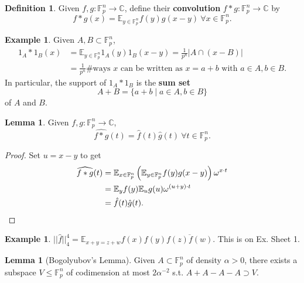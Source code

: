 \documentclass{article}
\theoremstyle{definition}
\newtheorem{lemma}[theorem]{Lemma}
\newtheorem{example}[theorem]{Example}
\newtheorem{defn}[theorem]{Definition}
\begin{document}

\begin{defn}\label{defn1.9}
    Given $f, g : \mathbb{F}_p^n \to \mathbb{C}$, define their \textbf{convolution} $f * g :\mathbb{F}_p^n \to \mathbb{C}$ by $$f*g(x) = \mathbb{E}_{y \in \mathbb{F}_p^n}f(y)g(x-y) ~\forall x \in \mathbb{F}_p^n.$$
\end{defn}
\begin{example}\label{ex1.10}
    Given $A, B \subset \mathbb{F}_p^n$, 
    \begin{align*}
        1_A * 1_B(x) &= \mathbb{E}_{y \in \mathbb{F}_p^n}1_A(y)1_B(x-y) = \frac{1}{p^n}|A \cap (x-B)| \\
        &= \frac{1}{p^n} \# \text{ways }x \text{ can be written as }x=a+b \text{ with }a \in A, b \in B.
    \end{align*}
    In particular, the support of $1_A * 1_B$ is the \textbf{sum set} \[
    A+B = \{a+b \mid a \in A, b \in B\}
    \]
    of $A$ and $B$.
\end{example}
\begin{lemma}\label{lemma1.11}
    Given $f, g : \mathbb{F}_p^n \to \mathbb{C}$, $$\widehat{f * g}(t) = \hat{f}(t)\hat{g}(t) ~\forall t \in \mathbb{F}_p^n.$$
\end{lemma}
\begin{proof}
    Set $u = x-y$ to get
    \begin{align*}
        \widehat{f * g}(t) &= \mathbb{E}_{x \in \mathbb{F}_p^n}\left(\mathbb{E}_{y \in \mathbb{F}_p^n}f(y)g(x-y)\right)\omega^{x \cdot t} \\
        &= \mathbb{E}_y f(y) \mathbb{E}_u g(u) \omega^{(u+y)\cdot t} \\
        &= \hat{f}(t)\hat{g}(t).\qedhere
    \end{align*}
\end{proof}
\begin{example}
    $||\hat{f}||_4^4 = \mathbb{E}_{x+y=z+w}f(x)f(y)\overline{f(z)f(w)}$. This is on Ex. Sheet 1.
\end{example}
\begin{lemma}[Bogolyubov's Lemma]
    Given $A \subset \mathbb{F}_p^n$ of density $\alpha>0$, there exists a subspace $V\le \mathbb{F}_p^n$ of codimension at most $2\alpha^{-2}$ s.t. $A+A-A-A \supset V$. 
\end{lemma}
\end{document}
